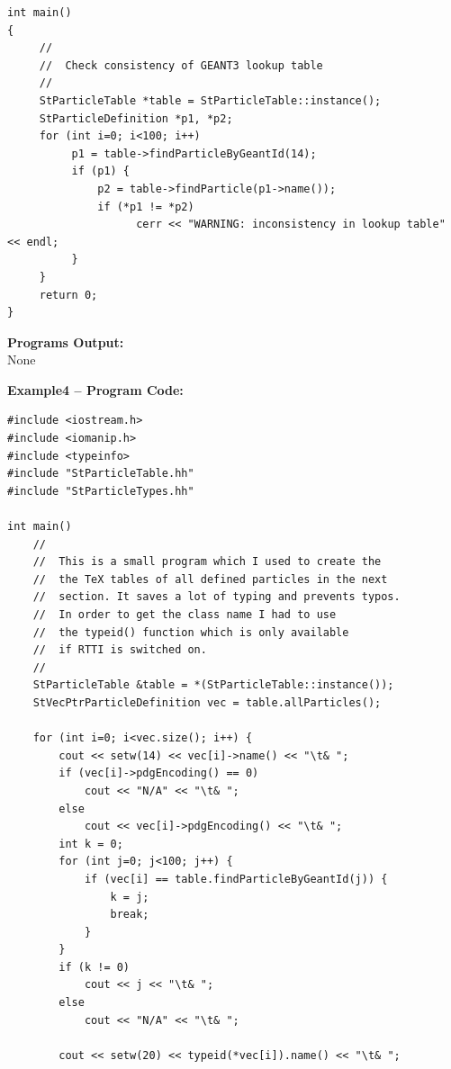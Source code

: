 \documentclass[twoside]{article}
\begin{document}
{\begin{verbatim}
int main()
{
     //
     //  Check consistency of GEANT3 lookup table
     //
     StParticleTable *table = StParticleTable::instance();
     StParticleDefinition *p1, *p2;
     for (int i=0; i<100; i++)
          p1 = table->findParticleByGeantId(14);
          if (p1) {
              p2 = table->findParticle(p1->name());
              if (*p1 != *p2)
                    cerr << "WARNING: inconsistency in lookup table" << endl;
          }
     }
     return 0;  
}
\end{verbatim}
{\bf Programs Output:}\\
None

{\bf Example4 -- Program Code:}  
\begin{verbatim}
#include <iostream.h>
#include <iomanip.h>
#include <typeinfo>
#include "StParticleTable.hh"
#include "StParticleTypes.hh"

int main()
    //
    //  This is a small program which I used to create the
    //  the TeX tables of all defined particles in the next
    //  section. It saves a lot of typing and prevents typos.
    //  In order to get the class name I had to use
    //  the typeid() function which is only available
    //  if RTTI is switched on. 
    // 
    StParticleTable &table = *(StParticleTable::instance());
    StVecPtrParticleDefinition vec = table.allParticles();

    for (int i=0; i<vec.size(); i++) {
        cout << setw(14) << vec[i]->name() << "\t& ";
        if (vec[i]->pdgEncoding() == 0)
            cout << "N/A" << "\t& ";
        else
            cout << vec[i]->pdgEncoding() << "\t& ";
        int k = 0;
        for (int j=0; j<100; j++) {
            if (vec[i] == table.findParticleByGeantId(j)) {
                k = j;
                break;
            }
        }
        if (k != 0) 
            cout << j << "\t& ";
        else
            cout << "N/A" << "\t& ";

        cout << setw(20) << typeid(*vec[i]).name() << "\t& ";


\end{verbatim}}
\end{document}
